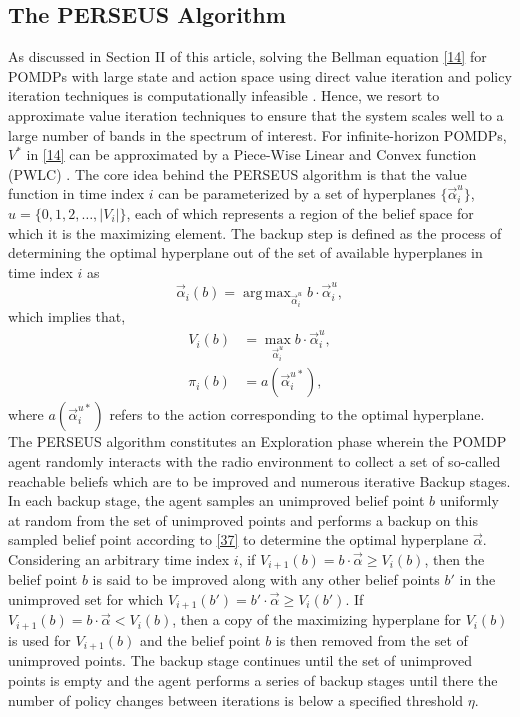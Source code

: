 \documentclass[10pt,twocolumn]{IEEEtran}
\newcommand{\bk}[1]{{\color{magenta}{[BK: #1]}}}
\DeclareMathOperator*{\argmax}{arg\,max}
\begin{document}
\subsection{The PERSEUS Algorithm}
As discussed in Section II of this article, solving the Bellman equation \eqref{14} for POMDPs with large state and action space using direct value iteration and policy iteration techniques is computationally infeasible \bk{citation}. Hence, we resort to approximate value iteration techniques \bk{citation} to ensure that the system scales well to a large number of bands in the spectrum of interest. For infinite-horizon POMDPs, $V^*$ in \eqref{14} can be approximated by a Piece-Wise Linear and Convex function (PWLC) \bk{citation}. The core idea behind the PERSEUS algorithm is that the value function in time index $i$ can be parameterized by a set of hyperplanes $\{\vec{\alpha}_i^{u}\}$, $u = \{0,1,2,\dots,|V_i|\}$, each of which represents a region of the belief space for which it is the maximizing element. The backup step is defined as the process of determining the optimal hyperplane out of the set of available hyperplanes in time index $i$ as
\begin{equation}\label{37}
    \vec{\alpha}_{i}(b) = \argmax_{\vec{\alpha}_{i}^u} b \cdot \vec{\alpha}_{i}^u,
\end{equation}
which implies that,
\begin{equation}\label{38}
    \begin{split}
        V_i(b) &= \max_{\vec{\alpha}_{i}^u} b \cdot \vec{\alpha}_{i}^u,\\
        \pi_i(b) &= a(\vec{\alpha}_i^{u*}),
    \end{split}
\end{equation}
where $a(\vec{\alpha}_i^{u*})$ refers to the action corresponding to the optimal hyperplane. The PERSEUS algorithm constitutes an Exploration phase wherein the POMDP agent randomly interacts with the radio environment to collect a set of so-called reachable beliefs which are to be improved and numerous iterative Backup stages. In each backup stage, the agent samples an unimproved belief point $b$ uniformly at random from the set of unimproved points and performs a backup on this sampled belief point according to \eqref{37} to determine the optimal hyperplane $\vec{\alpha}$. Considering an arbitrary time index $i$, if $V_{i+1}(b) = b \cdot \vec{\alpha} \geq V_{i}(b)$, then the belief point $b$ is said to be improved along with any other belief points $b'$ in the unimproved set for which $V_{i+1}(b') = b' \cdot \vec{\alpha} \geq V_{i}(b')$. If $V_{i+1}(b) = b \cdot \vec{\alpha} < V_{i}(b)$, then a copy of the maximizing hyperplane for $V_i(b)$ is used for $V_{i+1}(b)$ and the belief point $b$ is then removed from the set of unimproved points. The backup stage continues until the set of unimproved points is empty and the agent performs a series of backup stages until there the number of policy changes between iterations is below a specified threshold $\eta$.
\end{document}

